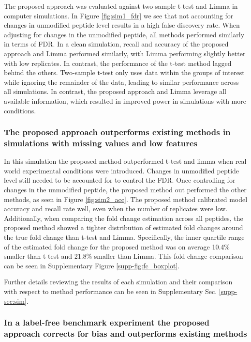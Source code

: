 \documentclass[mcp]{article}
\numberwithin{table}{section}
\begin{document}
The proposed approach was evaluated against two-sample t-test and Limma in computer simulations. 
In Figure \ref{fig:sim1_fdr} we see that not accounting for changes in unmodified peptide level results in a high false discovery rate. When adjusting for changes in the unmodified peptide, all methods performed similarly in terms of FDR. In a clean simulation, recall and accuracy of the proposed approach and Limma performed similarly, with Limma performing slightly better with low replicates. In contrast, the performance of the t-test method lagged behind the others. Two-sample t-test only uses data within the groups of interest while ignoring the remainder of the data, leading to similar performance across all simulations. In contrast, the proposed approach and Limma leverage all available information, which resulted in improved power in simulations with more conditions.

\subsubsection*{The proposed approach outperforms existing methods in simulations with missing values and low features}

In this simulation the proposed method outperformed t-test and limma when real world experimental conditions were introduced. Changes in unmodified peptide level still needed to be accounted for to control the FDR. Once controlling for changes in the unmodified peptide, the proposed method out performed the other methods, as seen in Figure \ref{fig:sim2_acc}. The proposed method calibrated model accuracy and recall rate well, even when the number of replicates were low. Additionally, when comparing the fold change estimation across all peptides, the proposed method showed a tighter distribution of estimated fold changes around the true fold change than t-test and Limma. Specifically, the inner quartile range of the estimated fold change for the proposed method was on average 10.4\% smaller than t-test and 21.8\% smaller than Limma. This fold change comparison can be seen in Supplementary Figure \ref{supp-fig:fc_boxplot}.

Further details reviewing the results of each simulation and their comparison with respect to method performance can be seen in Supplementary Sec. \ref{supp-sec:sim}. 


\subsubsection*{In a label-free benchmark experiment the proposed approach corrects for bias and outperforms existing methods}
\end{document}

